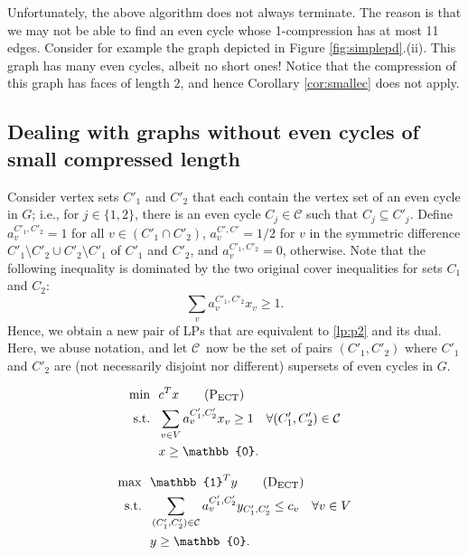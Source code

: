 \documentclass{article}
\newcommand{\st}{\ensuremath{\mbox{s.t.}}}
\newcommand{\ect}{\ensuremath{\mbox{ECT}}}
\newcommand{\C}{\ensuremath{\mathcal{C}}}
\newcommand{\0}{\mathbb{0}}
\newcommand{\1}{\mathbb{1}}
\begin{document}
Unfortunately, the above algorithm does not always terminate. The
reason is that we may not be able to find an even cycle whose
1-compression has at most 11 edges. Consider for example the 
graph depicted in Figure \ref{fig:simplepd}.(ii). This graph has many even
cycles, albeit no short ones! Notice that the compression of this
graph has faces of length $2$, and hence Corollary \ref{cor:smallec}
does not apply. 

\subsection{Dealing with graphs without even cycles of small
  compressed length}

Consider vertex sets $C'_1$ and $C'_2$ that each contain the  vertex set of an even cycle
in $G$; i.e., for $j \in \{1,2\}$, there is an even cycle $C_j \in \C$ such that $C_j
\subseteq C'_j$. 
Define $a_v^{C'_1,C'_2}=1$
for all $v \in (C'_1 \cap C'_2)$, $a_v^{C',C'}=1/2$ for
$v$ in the symmetric difference $C'_1\setminus C'_2 \cup C'_2 \setminus C'_1$
of $C'_1$ and $C'_2$, and
$a_v^{C'_1,C'_2}=0$, otherwise. Note that the following inequality is
dominated by the two original cover inequalities for
sets $C_1$ and $C_2$:
\[ \sum_{v} a^{C'_1,C'_2}_v x_v \geq 1. \]
Hence, we obtain a new
pair of LPs that are equivalent to \eqref{lp:p2} and its
dual. Here, we abuse notation, and let \C\ now be the set of pairs $(C'_1,C'_2)$ where
$C'_1$ and $C'_2$ are (not necessarily disjoint nor different) 
supersets of even cycles in $G$.

\medskip

\hspace*{-.7cm}
\begin{minipage}{.48\textwidth}
\begin{align}
  \min ~~ & c^Tx \tag{$\mbox{P}_{\scriptsize \ect}$} \label{lp:p3} \\
  \st ~~ & \sum_{v \in V}a^{C'_1,C'_2}_vx_v \geq 1 \quad \forall 
  (C'_1,C'_2) \in \C \notag \\
          & x \geq \0. \notag
\end{align}
\end{minipage}
\hspace*{1ex}
\vline
\hspace*{1ex}
\begin{minipage}{.48\textwidth}
\begin{align}
  \max ~~ & \1^Ty \tag{$\mbox{D}_{\scriptsize \ect}$} \label{lp:d3} \\
  \st ~~ & \sum_{(C'_1,C'_2) \in \C} a^{C'_1,C'_2}_vy_{C'_1,C'_2} \leq c_v \quad \forall v
  \in V
           \notag \\
          & y \geq \0. \notag
\end{align}
\end{minipage}
\medskip
\end{document}
